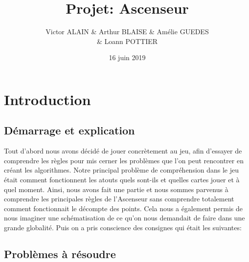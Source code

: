 \documentclass[12pt]{report}
\title{Projet: Ascenseur}
\date{16 juin 2019}
\author{Victor \textsc{ALAIN} \& Arthur \textsc{BLAISE} \& Amélie \textsc{GUEDES} \\ \& Loann \textsc{POTTIER}}
\begin{document}
\maketitle
\tableofcontents

\clearpage


\section{Introduction}

\subsection{Démarrage et explication}
	Tout d'abord nous avons décidé de jouer concrètement au jeu, afin d'essayer de comprendre les règles pour mis cerner les problèmes que l'on peut rencontrer en créant les algorithmes. Notre principal problème de compréhension dans le jeu était comment fonctionnent les atouts quels sont-ils et quelles cartes jouer et à quel moment. Ainsi, nous avons fait une partie et nous sommes parvenus à comprendre les principales règles de l'Ascenseur sans comprendre totalement comment fonctionnait le décompte des points. Cela nous a également permis de nous imaginer une schématisation de ce qu'on nous demandait de faire dans une grande globalité. Puis on a pris conscience des consignes qui était les suivantes:
	
\subsection{Problèmes à résoudre}
	
\end{document}
